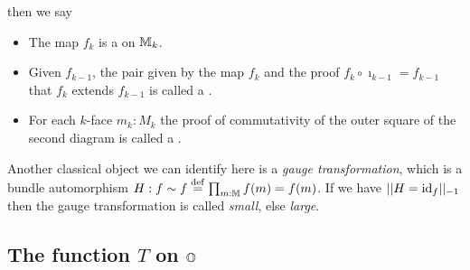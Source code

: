 \begin{center}
\end{center}
then we say
\begin{itemize}
\item The map \( f_k \) is a  on \( \mathbb{M}_k \).
\item Given \( f_{k-1} \), the pair given by the map \( f_k \) and the proof \( f_k\circ \imath_{k-1}=f_{k-1} \) that \( f_k \) extends \( f_{k-1} \) is called a .
\item For each \( k \)-face \( m_k:M_k \) the proof of commutativity of the outer square of the second diagram is called a .
\end{itemize}

\begin{mynote}
Another classical object we can identify here is a \emph{gauge transformation}, which is a bundle automorphism \( H:f\sim f\stackrel{\mathrm{def}}{=} \prod_{m:\mathbb{M}}f(m)=f(m) \). If we have \( ||H=\text{id}_f||_{-1} \) then the gauge transformation is called \emph{small}, else \emph{large}.
\end{mynote}

\subsection{The function \texorpdfstring{\( T \)}{T} on \texorpdfstring{\( \mathbb{O} \)}{O}}

